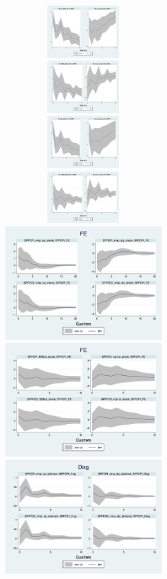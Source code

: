 \documentclass[]{article}
\begin{document}
\begin{figure}[ht]
	\centering
	\includegraphics[width=6cm,height=2cm]{figures/CPIAU_ashocks_nmp.png}  
	\includegraphics[width=6cm,height=2cm]{figures/CPIAU_ashocks.png} \\
	\includegraphics[width=6cm,height=2cm]{figures/PCEPI_ashocks_nmp.png} 
	\includegraphics[width=6cm,height=2cm]{figures/PCEPI_ashocks.png}  \\
	\smallskip
	\includegraphics[width=6cm]{figures/SPFFE_ashocks_nmp.png} 
		\includegraphics[width=6cm]{figures/SPFFE_ashocks.png} \\
	\smallskip
	\includegraphics[width=6cm]{figures/SPFDisg_ab_ashocks_nmp.png} 

\end{figure}
\end{document}
